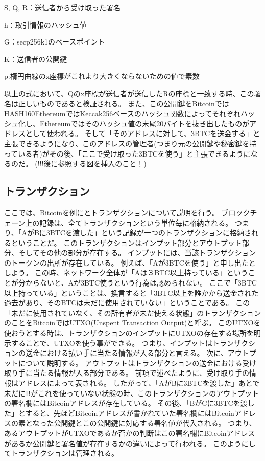 \begin{list}{}{}
\item S, Q, R：送信者から受け取った署名
\item h：取引情報のハッシュ値
\item G：secp256k1のベースポイント
\item K：送信者の公開鍵
\item p:楕円曲線のx座標がこれより大きくならないための値で素数
\end{list}

以上の式において、Qのx座標が送信者が送信したRの座標と一致する時、この署名は正しいものであると検証される。
また、この公開鍵をBitcoinではHASH160EthereumではKeccak256ベースのハッシュ関数によってそれぞれハッシュ化し、Ethereumではそのハッシュ値の末尾20バイトを抜き出したものがアドレスとして使われる。
そして「そのアドレスに対して、3BTCを送金する」と主張できるようになり、このアドレスの管理者(つまり元の公開鍵や秘密鍵を持っている者)がその後、「ここで受け取った3BTCを使う」と主張できるようになるのだ。
(!!!後に参照する図を挿入のこと！)

\subsection{トランザクション}
ここでは、Bitcoinを例にとトランザクションについて説明を行う。
ブロックチェーン上の記録は、全てトランザクションという単位毎に格納される。
つまり、「AがBに3BTCを渡した」という記録が一つのトランザクションに格納されるということだ。
このトランザクションはインプット部分とアウトプット部分、そしてその他の部分が存在する。
インプットには、当該トランザクションのトークンの出所が存在している。
例えば、「Aが3BTCを使う」と申し出たとしよう。
この時、ネットワーク全体が「Aは３BTC以上持っている」ということが分からないと、Aが3BTC使うという行為は認められない。
ここで「3BTC以上持っている」ということは、換言すると「3BTC以上を誰かから送金された過去があり、そのBTCは未だに使用されていない」ということである。
この「未だに使用されていなく、その所有者が未だ使える状態」のトランザクションのことをBitcoinではUTXO(Unspent Transaction Output)と呼ぶ。
このUTXOを使おうとする時は、トランザクションのインプットにUTXOの存在する場所を明示することで、UTXOを使う事ができる。
つまり、インプットはトランザクションの送金における払い手に当たる情報が入る部分と言える。
次に、アウトプットについて説明する。
アウトプットはトランザクションの送金における受け取り手に当たる情報が入る部分である。
前項で述べたように、受け取り手の情報はアドレスによって表される。
したがって、「AがBに3BTCを渡した」あとで未だにBがこれを使っていない状態の時、このトランザクションのアウトプットの署名欄にはBitcoinアドレスが存在している。
その後、「BがCに3BTCを渡した」とすると、先ほどBitcoinアドレスが書かれていた署名欄にはBitcoinアドレスの素となった公開鍵とこの公開鍵に対応する署名値が代入される。
つまり、あるアウトプットがUTXOであるか否かの判断はこの署名欄にBitcoinアドレスがあるか公開鍵と署名値が存在するかの違いによって行われる。
このようにしてトランザクションは管理される。

